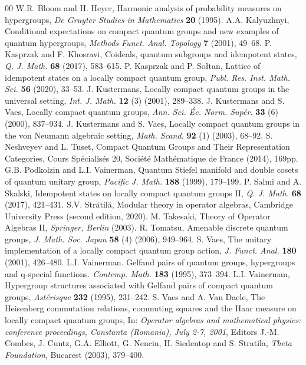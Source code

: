 \documentclass[reqno]{amsart}
\numberwithin{equation}{section}
\begin{document}
\begin{thebibliography}{00}
 W.R. Bloom and H. Heyer, Harmonic analysis of probability measures on hypergroups, \emph{De Gruyter Studies in Mathematics} \textbf{20} (1995).
 A.A. Kalyuzhnyi, Conditional expectations on compact quantum groups and new examples of quantum hypergroups, \emph{Methods Funct. Anal. Topology} \textbf{7} (2001), 49--68.
 P. Kasprzak and F. Khosravi, Coideals, quantum subgroups and idempotent states, \emph{Q. J. Math.} \textbf{68} (2017), 583--615.
 P. Kasprzak and P. So\l tan, Lattice of idempotent states on a locally compact quantum group, \emph{Publ. Res. Inst. Math. Sci.} \textbf{56} (2020), 33--53.
 J. Kustermans, Locally compact quantum groups in the universal setting, \emph{Int. J. Math.} \textbf{12} (3) (2001), 289--338.
 J. Kustermans and S. Vaes, Locally compact quantum groups, \emph{Ann. Sci. \'{E}c. Norm. Sup\'{e}r.} \textbf{33} (6) (2000), 837--934.
 J. Kustermans and S. Vaes, Locally compact quantum groups in the von Neumann algebraic setting, \emph{Math. Scand.} \textbf{92} (1) (2003), 68--92.
 S. Neshveyev and L. Tuset, Compact Quantum Groups and Their Representation Categories, Cours Sp\'{e}cialis\'{e}s 20, Soci\'{e}t\'{e} Math\'{e}matique de France (2014), 169pp.
 G.B. Podkolzin and L.I. Vainerman, Quantum {S}tiefel manifold and double cosets of quantum unitary group, \emph{Pacific J. Math.} \textbf{188} (1999), 179--199.
 P. Salmi and A. Skalski, Idempotent states on locally compact quantum groups {II}, \emph{Q. J. Math.} \textbf{68} (2017), 421--431.
  S.V. Str\u atil\u a, Modular theory in operator algebras, Cambridge University Press (second edition, 2020).
 M. Takesaki, Theory of Operator Algebras II, \emph{Springer, Berlin} (2003).
 R. Tomatsu, Amenable discrete quantum groups, \emph{J. Math. Soc. Japan} \textbf{58} (4) (2006), 949--964. 
 S. Vaes, The unitary implementation of a locally compact quantum group action, \emph{J. Funct. Anal.} \textbf{180} (2001), 426--480.
 L.I. Vainerman. Gelfand pairs of quantum groups, hypergroups and q-special functions. \emph{Contemp. Math.} \textbf{183} (1995), 373--394.
 L.I. Vainerman, Hypergroup structures associated with {G}el\cprime fand pairs of compact quantum groups, \emph{Ast\'erisque} \textbf{232} (1995), 231--242.
 S. Vaes and A. Van Daele, The Heisenberg commutation relations, commuting squares and the Haar measure on locally compact quantum groups, In: \emph{Operator algebras and mathematical physics: conference proceedings, Constanta (Romania), July 2-7, 2001}, Editors J.-M. Combes, J. Cuntz, G.A. Elliott, G. Nenciu, H. Siedentop and S. Stratila, \emph{Theta Foundation}, Bucarest (2003), 379--400.

\end{thebibliography}
\end{document}
